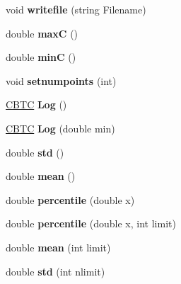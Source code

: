 \begin{DoxyCompactItemize}
\item 
\mbox{\label{class_c_b_t_c_a3d7ff85422828a1a2ba3e5f1781bc9c2}} 
void {\bfseries writefile} (string Filename)
\item 
\mbox{\label{class_c_b_t_c_ac6d991b7d9a8d92cee27b9b410d8aae9}} 
double {\bfseries maxC} ()
\item 
\mbox{\label{class_c_b_t_c_ab0f26a77cda082b0a39bbd02cdef58d6}} 
double {\bfseries minC} ()
\item 
\mbox{\label{class_c_b_t_c_aa5d62ca03782794208f23d363b4a94cd}} 
void {\bfseries setnumpoints} (int)
\item 
\mbox{\label{class_c_b_t_c_a4a0b001b472c6d1807e1823311bbe741}} 
\hyperlink{class_c_b_t_c}{C\+B\+TC} {\bfseries Log} ()
\item 
\mbox{\label{class_c_b_t_c_aa0a7120e041d12ad54f09358f66ec68d}} 
\hyperlink{class_c_b_t_c}{C\+B\+TC} {\bfseries Log} (double min)
\item 
\mbox{\label{class_c_b_t_c_aa1e967f5e0f8aad386466b5bab210837}} 
double {\bfseries std} ()
\item 
\mbox{\label{class_c_b_t_c_aa14db5641c47e4a451b1d992a2a5f055}} 
double {\bfseries mean} ()
\item 
\mbox{\label{class_c_b_t_c_ad267c5f6c6a7e3022d69e38de52da263}} 
double {\bfseries percentile} (double x)
\item 
\mbox{\label{class_c_b_t_c_a77042bbcdbe26f5123dca72d60123d8f}} 
double {\bfseries percentile} (double x, int limit)
\item 
\mbox{\label{class_c_b_t_c_a0c04b8e8afaf9b0aa1c09597d4a161ed}} 
double {\bfseries mean} (int limit)
\item 
\mbox{\label{class_c_b_t_c_af2a3de0cc95c86af9133c6d8c97604f2}} 
double {\bfseries std} (int nlimit)
\item 
\mbox{\label{class_c_b_t_c_ad092986c4df0d05cf426c2385ab984dd}} 

\end{DoxyCompactItemize}
